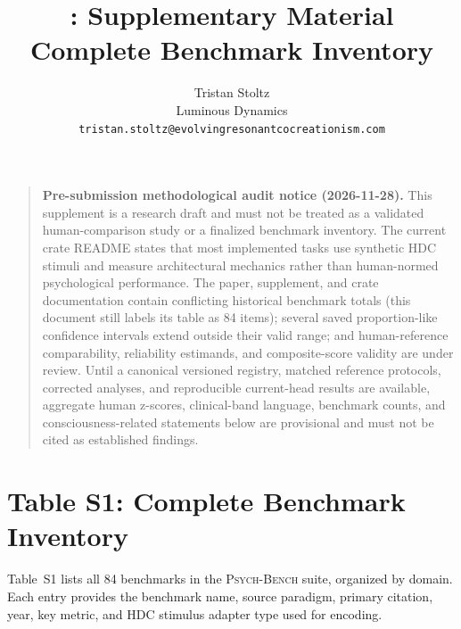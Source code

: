 \documentclass[10pt,landscape]{article}
\title{\psychbench{}: Supplementary Material\\
\large Complete Benchmark Inventory}
\author{Tristan Stoltz\\
Luminous Dynamics\\
\texttt{tristan.stoltz@evolvingresonantcocreationism.com}}
\date{}
\newcommand{\psychbench}{\textsc{Psych-Bench}}
\begin{document}
\maketitle

\begin{quote}
\textbf{Pre-submission methodological audit notice (2026-11-28).}
This supplement is a research draft and must not be treated as a validated
human-comparison study or a finalized benchmark inventory. The current crate
README states that most implemented tasks use synthetic HDC stimuli and measure
architectural mechanics rather than human-normed psychological performance.
The paper, supplement, and crate documentation contain conflicting historical
benchmark totals (this document still labels its table as 84 items); several saved proportion-like confidence intervals extend
outside their valid range; and human-reference comparability, reliability
estimands, and composite-score validity are under review. Until a canonical
versioned registry, matched reference protocols, corrected analyses, and
reproducible current-head results are available, aggregate human z-scores,
clinical-band language, benchmark counts, and consciousness-related statements
below are provisional and must not be cited as established findings.
\end{quote}


\section*{Table S1: Complete Benchmark Inventory}

Table~S1 lists all 84 benchmarks in the \psychbench{} suite, organized by domain. Each entry provides the benchmark name, source paradigm, primary citation, year, key metric, and HDC stimulus adapter type used for encoding.
\end{document}
